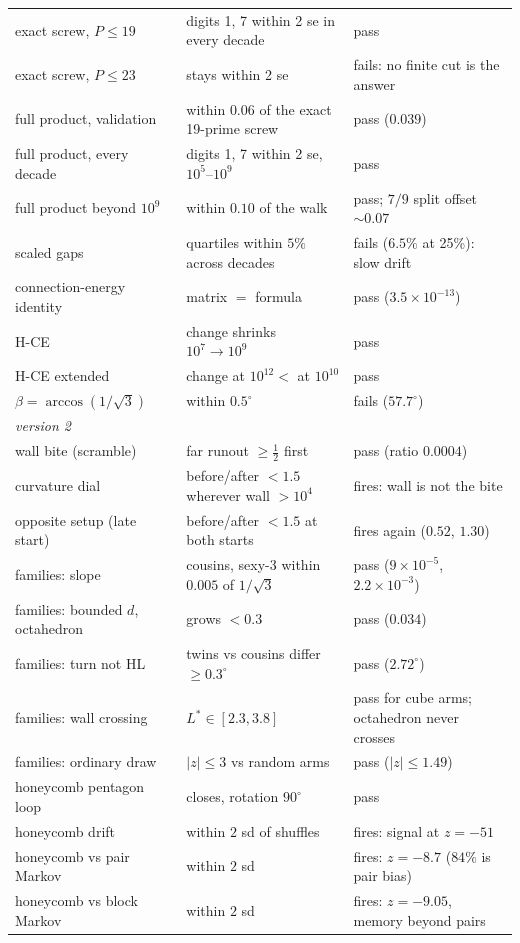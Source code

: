 \documentclass[11pt]{article}
\theoremstyle{definition}
\theoremstyle{remark}
\begin{document}
\begin{longtable}{p{4.2cm}p{6.2cm}p{4.3cm}}
exact screw, $P\le19$ & digits 1, 7 within 2 se in every decade & pass\\
exact screw, $P\le23$ & stays within 2 se & fails: no finite cut is the answer\\
full product, validation & within $0.06$ of the exact 19-prime screw & pass ($0.039$)\\
full product, every decade & digits 1, 7 within 2 se, $10^5$--$10^9$ & pass\\
full product beyond $10^9$ & within $0.10$ of the walk & pass; $7/9$ split offset $\sim0.07$\\
scaled gaps & quartiles within $5\%$ across decades & fails ($6.5\%$ at 25\%): slow drift\\
connection-energy identity & matrix $=$ formula & pass ($3.5\times10^{-13}$)\\
H-CE & change shrinks $10^7\to10^9$ & pass\\
H-CE extended & change at $10^{12}<$ at $10^{10}$ & pass\\
$\beta=\arccos(1/\sqrt3)$ & within $0.5^\circ$ & fails ($57.7^\circ$)\\
\multicolumn{3}{l}{\emph{version 2}}\\
wall bite (scramble) & far runout $\ge\tfrac12$ first & pass (ratio $0.0004$)\\
curvature dial & before/after $<1.5$ wherever wall $>10^4$ & fires: wall is not the bite\\
opposite setup (late start) & before/after $<1.5$ at both starts & fires again ($0.52$, $1.30$)\\
families: slope & cousins, sexy-3 within $0.005$ of $1/\sqrt3$ & pass ($9\times10^{-5}$, $2.2\times10^{-3}$)\\
families: bounded $d$, octahedron & grows $<0.3$ & pass ($0.034$)\\
families: turn not HL & twins vs cousins differ $\ge0.3^\circ$ & pass ($2.72^\circ$)\\
families: wall crossing & $L^*\in[2.3,3.8]$ & pass for cube arms; octahedron never crosses\\
families: ordinary draw & $|z|\le3$ vs random arms & pass ($|z|\le1.49$)\\
honeycomb pentagon loop & closes, rotation $90^\circ$ & pass\\
honeycomb drift & within $2$ sd of shuffles & fires: signal at $z=-51$\\
honeycomb vs pair Markov & within $2$ sd & fires: $z=-8.7$ ($84\%$ is pair bias)\\
honeycomb vs block Markov & within $2$ sd & fires: $z=-9.05$, memory beyond pairs\\


\end{longtable}
\end{document}
